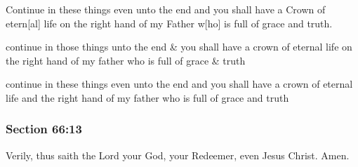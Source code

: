 		\begin{framed}
		\scriptsize
			\begin{compactdesc}
				\item[JSP] Continue in these things even unto the end and you shall have a Crown of etern[al] life on the right hand of my Father w[ho] is full of grace and truth.
				\item[RB1] continue in those things unto the end \& you shall have a crown of eternal life on the right hand of my father who is full of grace \& truth
				\item[RB2] continue in these things even unto the end and you shall have a crown of eternal life and the right hand of my father who is full of grace and truth
			\end{compactdesc}
		\end{framed}

	\subsubsection{Section 66:13} %
		\label{DC66-13}

		Verily, thus saith the Lord your God, your Redeemer, even Jesus Christ.  Amen.

